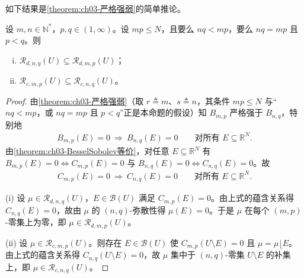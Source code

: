 \documentclass[../../main.tex]{subfiles}%
\begin{document}
如下结果是\cref{theorem:ch03-严格强弱}的简单推论。

\begin{proposition}\label{proposition:ch03-集中弥散包含}\label{proposition:ch03-容量包含}
设 $m,n\in\mathbb{N}^*$，$p,q\in(1,\infty)$。设 $mp\leqslant N$，且要么 $nq<mp$，要么 $nq=mp$ 且 $p<q$。则
\begin{enumerate}[(i)]
\item $\mathscr{R}_{d,n,q}(U)\subseteq\mathscr{R}_{d,m,p}(U)$；
\item $\mathscr{R}_{c,m,p}(U)\subseteq\mathscr{R}_{c,n,q}(U)$。
\end{enumerate}
\end{proposition}

\begin{proof}
由\cref{theorem:ch03-严格强弱}（取 $r\triangleq m$、$s\triangleq n$，其条件 $mp\leqslant N$ 与“$nq<mp$，或 $nq=mp$ 且 $p<q$”正是本命题的假设）知 $B_{m,p}$ 严格强于 $B_{n,q}$，特别地
\begin{align*}
B_{m,p}(E)=0\ \Longrightarrow\ B_{n,q}(E)=0\qquad\text{对所有 }E\subseteq\mathbb{R}^N.
\end{align*}
由\cref{theorem:ch03-BesselSobolev等价}，对任意 $E\subseteq\mathbb{R}^N$ 有 $B_{m,p}(E)=0\Leftrightarrow C_{m,p}(E)=0$ 与 $B_{n,q}(E)=0\Leftrightarrow C_{n,q}(E)=0$。故
\begin{align*}
C_{m,p}(E)=0\ \Longrightarrow\ C_{n,q}(E)=0\qquad\text{对所有 }E\subseteq\mathbb{R}^N.
\end{align*}

(i) 设 $\mu\in\mathscr{R}_{d,n,q}(U)$，$E\in\mathcal{B}(U)$ 满足 $C_{m,p}(E)=0$。由上式的蕴含关系得 $C_{n,q}(E)=0$，故由 $\mu$ 的 $(n,q)$-弥散性得 $\mu(E)=0$。于是 $\mu$ 在每个 $(m,p)$-零集上为零，即 $\mu\in\mathscr{R}_{d,m,p}(U)$。

(ii) 设 $\mu\in\mathscr{R}_{c,m,p}(U)$。则存在 $E\in\mathcal{B}(U)$ 使 $C_{m,p}(U\setminus E)=0$ 且 $\mu=\mu\lfloor E$。由上式的蕴含关系得 $C_{n,q}(U\setminus E)=0$，故 $\mu$ 集中于 $(n,q)$-零集 $U\setminus E$ 的补集上，即 $\mu\in\mathscr{R}_{c,n,q}(U)$。
\end{proof}
\end{document}
